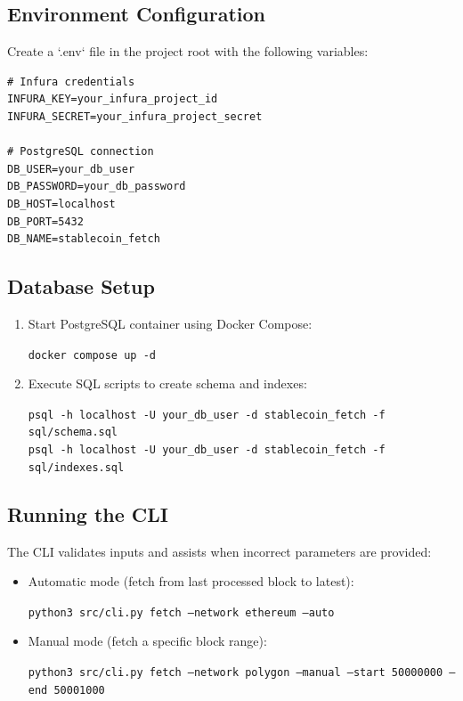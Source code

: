 \documentclass[a4paper,12pt]{report}
\begin{document}
\subsection*{Environment Configuration}
Create a `.env` file in the project root with the following variables:

\begin{verbatim}
# Infura credentials
INFURA_KEY=your_infura_project_id
INFURA_SECRET=your_infura_project_secret

# PostgreSQL connection
DB_USER=your_db_user
DB_PASSWORD=your_db_password
DB_HOST=localhost
DB_PORT=5432
DB_NAME=stablecoin_fetch
\end{verbatim}

\subsection*{Database Setup}
\begin{enumerate}
    \item Start PostgreSQL container using Docker Compose:
    \begin{flushleft}
        \texttt{\small docker compose up -d}
    \end{flushleft}

    \item Execute SQL scripts to create schema and indexes:
    \begin{flushleft}
        \texttt{\small psql -h localhost -U your\_db\_user -d stablecoin\_fetch -f sql/schema.sql} \\
        \texttt{\small psql -h localhost -U your\_db\_user -d stablecoin\_fetch -f sql/indexes.sql}
    \end{flushleft}
\end{enumerate}

\subsection*{Running the CLI}
The CLI validates inputs and assists when incorrect parameters are provided:

\begin{itemize}
    \item Automatic mode (fetch from last processed block to latest):
    \begin{flushleft}
        \texttt{\small python3 src/cli.py fetch --network ethereum --auto}
    \end{flushleft}

    \item Manual mode (fetch a specific block range):
    \begin{flushleft}
        \texttt{\small python3 src/cli.py fetch --network polygon --manual --start 50000000 --end 50001000}
    \end{flushleft}
\end{itemize}
\end{document}
